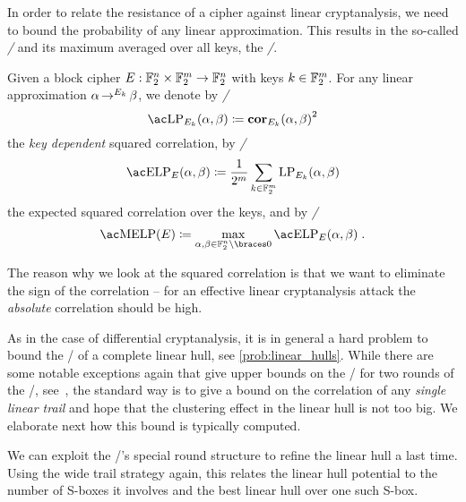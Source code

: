 In order to relate the resistance of a cipher against linear cryptanalysis, we need to bound the probability of any linear approximation.
This results in the so-called \emph{\LPl/} and its maximum averaged over all keys, the \emph{\MELPl/}.
\begin{definition}\label{def:lp-elp-melp}
    Given a block cipher $E : \mathbb{F}_2^n \times \mathbb{F}_2^m \to \mathbb{F}_2^n$ with keys $k \in \mathbb{F}_2^m$.
    For any linear approximation $\alpha \operatorname*{\rightarrow}^{E_k}_{} \beta$, we denote by \emph{\LPf/}
    \begin{equation*}
        \mathrm{\LP/}_{E_k}(\alpha, \beta) \coloneqq {\cor_{E_k}(\alpha, \beta)}^2
    \end{equation*}
    the \emph{key dependent} squared correlation, by \emph{\ELPf/}
    \begin{equation*}
        \mathrm{\ELP/}_E(\alpha, \beta) \coloneqq \frac{1}{2^m} \sum_{k \in \F_2^m} \mathrm{LP}_{E_k}(\alpha, \beta)
    \end{equation*}
    the expected squared correlation over the keys, and by \emph{\MELPf/}
    \begin{equation*}
        \mathrm{\MELP/}(E) \coloneqq \max_{\alpha, \beta \in \F_2^n\setminus\set{0}} \mathrm{\ELP/}_E(\alpha, \beta)\;.
    \end{equation*}
\end{definition}
The reason why we look at the squared correlation is that we want to eliminate the sign of the correlation -- for an effective linear cryptanalysis attack the \emph{absolute} correlation should be high.

As in the case of differential cryptanalysis, it is in general a hard problem to bound the \MELP/ of a complete linear hull, see \cref{prob:linear_hulls}.
While there are some notable exceptions again that give upper bounds on the \MELP/ for two rounds of the \AES/, see~, the standard way is to give a bound on the correlation of any \emph{single linear trail} and hope that the clustering effect in the linear hull is not too big.
We elaborate next how this bound is typically computed.

We can exploit the \SPN/'s special round structure to refine the linear hull a last time.
Using the wide trail strategy again, this relates the linear hull potential to the number of S-boxes it involves and the best linear hull over one such S-box.

